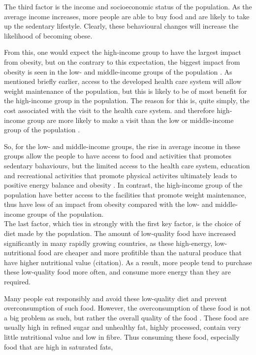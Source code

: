 \noindent
The third factor is the income and socioeconomic status of the population.
As the average income increases, more people are able to buy food and are likely to take up the sedentary lifestyle.
Clearly, these behavioural changes will increase the likelihood of becoming obese.

From this, one would expect the high-income group to have the largest impact from obesity, but on the contrary to this expectation, the biggest impact from obesity is seen in the low- and middle-income groups of the population \citep{Malik2013}.
As mentioned briefly earlier, access to the developed health care system will allow weight maintenance of the population, but this is likely to be of most benefit for the high-income group in the population.
The reason for this is, quite simply, the cost associated with the visit to the health care system.
and therefore high-income group are more likely to make a visit than the low or middle-income group of the population \citep{Malik2013}.

So, for the low- and middle-income groups, the rise in average income in these groups allow the people to have access to food and activities that promotes sedentary bahaviours, but the limited access to the health care system, education and recreational activities that promote physical activites ultimately leads to positive energy balance and obesity \citep{Malik2013}.
In contrast, the high-income group of the population have better access to the facilities that promote weight maintenance, thus have less of an impact from obesity compared with the low- and middle-income groups of the population.\\

\noindent
The last factor, which ties in strongly with the first key factor, is the choice of diet made by the population.
The amount of low-quality food have increased significantly in many rapidly growing countries, as these high-energy, low-nutritional food are cheaper and more profitible than the natural produce that have higher nutritional value (citation).
As a result, more people tend to purchase these low-quality food more often, and consume more energy than they are required.

Many people eat responsibly and avoid these low-quality diet and prevent overconsumption of such food.
However, the overconsumption of these food is not a big problem as such, but rather the overall quality of the food \citep{Malik2013}.
These food are usually high in refined sugar and unhealthy fat, highly processed, contain very little nutritional value and low in fibre.
Thus consuming these food, especially food that are high in saturated fats, 

